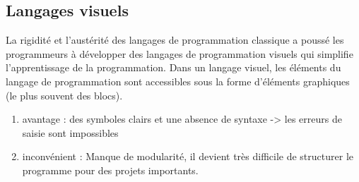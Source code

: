 \subsection{Langages visuels}		
La rigidité et l'austérité des langages de programmation classique a poussé les programmeurs à développer des langages de programmation visuels qui simplifie l'apprentissage de la programmation. Dans un langage visuel, les éléments du langage de programmation sont accessibles sous la forme d’éléments graphiques (le plus souvent des blocs).
\begin{enumerate}
	\item{avantage :} des symboles clairs et une absence  de syntaxe ->  les erreurs de saisie sont impossibles
	\item{inconvénient :} Manque de modularité, il devient très difficile de structurer le programme pour des projets importants.
\end{enumerate}
